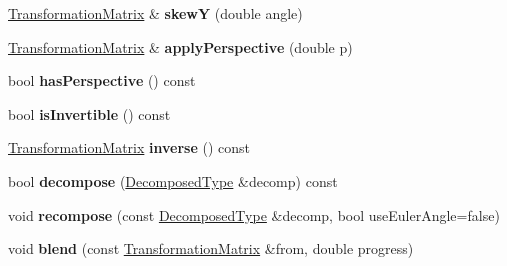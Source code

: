 \begin{DoxyCompactItemize}
\item 
\mbox{\label{class_web_core_1_1_transformation_matrix_a313d27ff9b3a1f4f610cbf50ad7f2e3c}} 
\mbox{\hyperlink{class_web_core_1_1_transformation_matrix}{Transformation\+Matrix}} \& {\bfseries skewY} (double angle)
\item 
\mbox{\label{class_web_core_1_1_transformation_matrix_ac555aee5d60fb400469115218a774b85}} 
\mbox{\hyperlink{class_web_core_1_1_transformation_matrix}{Transformation\+Matrix}} \& {\bfseries apply\+Perspective} (double p)
\item 
\mbox{\label{class_web_core_1_1_transformation_matrix_abc4a77370ac7456e97fce6a9d1d7f472}} 
bool {\bfseries has\+Perspective} () const
\item 
\mbox{\label{class_web_core_1_1_transformation_matrix_a86fc5891cad0b3492e90ef4e8e0391a5}} 
bool {\bfseries is\+Invertible} () const
\item 
\mbox{\label{class_web_core_1_1_transformation_matrix_a2dcabaa25983ac9eb972cdef6d7cd4cf}} 
\mbox{\hyperlink{class_web_core_1_1_transformation_matrix}{Transformation\+Matrix}} {\bfseries inverse} () const
\item 
\mbox{\label{class_web_core_1_1_transformation_matrix_a3ac23efda2366e7f160fb8c0e0b39bf2}} 
bool {\bfseries decompose} (\mbox{\hyperlink{struct_web_core_1_1_transformation_matrix_1_1_decomposed_type}{Decomposed\+Type}} \&decomp) const
\item 
\mbox{\label{class_web_core_1_1_transformation_matrix_a930065af80a1154a5396f11a436ccb64}} 
void {\bfseries recompose} (const \mbox{\hyperlink{struct_web_core_1_1_transformation_matrix_1_1_decomposed_type}{Decomposed\+Type}} \&decomp, bool use\+Euler\+Angle=false)
\item 
\mbox{\label{class_web_core_1_1_transformation_matrix_a89e8cbe67be97912a7bfe6fe8fd33950}} 
void {\bfseries blend} (const \mbox{\hyperlink{class_web_core_1_1_transformation_matrix}{Transformation\+Matrix}} \&from, double progress)

\end{DoxyCompactItemize}
